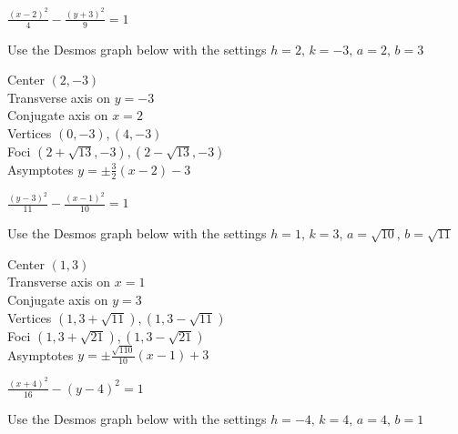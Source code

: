 \documentclass{ximera}
\begin{document}
\begin{question}
\begin{problem}
\end{problem}

\begin{problem}\label{oddhypethree}
     $\frac{(x - 2)^{2}}{4} - \frac{(y + 3)^{2}}{9} = 1$ 

\begin{solution}
Use the Desmos graph below with the settings $h=2,\,k=-3,\,a=2,\,b=3$

\begin{center} 
\end{center}
Center $(2, -3)$\\
Transverse axis on $y = -3$\\
Conjugate axis on $x = 2$\\
Vertices $(0, -3), (4, -3)$\\
Foci $(2 + \sqrt{13}, -3), (2 - \sqrt{13}, -3)$\\
Asymptotes $y = \pm \frac{3}{2}(x - 2) - 3$\\
\end{solution}
     
\end{problem}

\begin{problem}
    $\frac{(y - 3)^{2}}{11} - \frac{(x - 1)^{2}}{10} = 1$

\begin{solution}
Use the Desmos graph below with the settings $h=1,\,k=3,\,a=\sqrt{10},\,b=\sqrt{11}$

\begin{center} 
\end{center}
Center $(1, 3)$\\
Transverse axis on $x = 1$\\
Conjugate axis on $y = 3$\\
Vertices $(1, 3 + \sqrt{11}), (1, 3 - \sqrt{11})$\\
Foci $(1, 3 + \sqrt{21}), (1, 3 - \sqrt{21})$\\
Asymptotes $y = \pm \frac{\sqrt{110}}{10}(x - 1) + 3$\\
\end{solution}
    
\end{problem}

\begin{problem}\label{oddhypefive}
     $\frac{(x + 4)^{2}}{16} - (y - 4)^{2}= 1$  

\begin{solution}
Use the Desmos graph below with the settings $h=-4,\,k=4,\,a=4,\,b=1$


\end{solution}
\end{problem}
\end{question}
\end{document}
